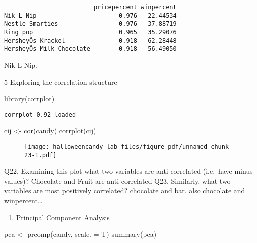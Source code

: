 \documentclass[
  letterpaper,
  DIV=11,
  numbers=noendperiod]{scrartcl}
\newenvironment{Shaded}{\begin{snugshade}}{\end{snugshade}}
\newcommand{\AttributeTok}[1]{\textcolor[rgb]{0.40,0.45,0.13}{#1}}
\newcommand{\FunctionTok}[1]{\textcolor[rgb]{0.28,0.35,0.67}{#1}}
\newcommand{\NormalTok}[1]{\textcolor[rgb]{0.00,0.23,0.31}{#1}}
\newcommand{\OtherTok}[1]{\textcolor[rgb]{0.00,0.23,0.31}{#1}}
\providecommand{\tightlist}{%
  \setlength{\itemsep}{0pt}\setlength{\parskip}{0pt}}\usepackage{longtable,booktabs,array}
\begin{document}
\begin{verbatim}
                         pricepercent winpercent
Nik L Nip                       0.976   22.44534
Nestle Smarties                 0.976   37.88719
Ring pop                        0.965   35.29076
HersheyÕs Krackel               0.918   62.28448
HersheyÕs Milk Chocolate        0.918   56.49050
\end{verbatim}

Nik L Nip.

5 Exploring the correlation structure

\begin{Shaded}
\begin{Highlighting}[]
\FunctionTok{library}\NormalTok{(corrplot)}
\end{Highlighting}
\end{Shaded}

\begin{verbatim}
corrplot 0.92 loaded
\end{verbatim}

\begin{Shaded}
\begin{Highlighting}[]
\NormalTok{cij }\OtherTok{\textless{}{-}} \FunctionTok{cor}\NormalTok{(candy)}
\FunctionTok{corrplot}\NormalTok{(cij)}
\end{Highlighting}
\end{Shaded}

\begin{figure}[H]

{\centering \texttt{[image: halloweencandy\_lab\_files/figure-pdf/unnamed-chunk-23-1.pdf]}

}

\end{figure}

Q22. Examining this plot what two variables are anti-correlated
(i.e.~have minus values)? Chocolate and Fruit are anti-correlated Q23.
Similarly, what two variables are most positively correlated? chocolate
and bar. also chocolate and winpercent\ldots{}

\begin{enumerate}
\def\labelenumi{\arabic{enumi}.}
\setcounter{enumi}{5}
\tightlist
\item
  Principal Component Analysis
\end{enumerate}

\begin{Shaded}
\begin{Highlighting}[]
\NormalTok{pca }\OtherTok{\textless{}{-}} \FunctionTok{prcomp}\NormalTok{(candy, }\AttributeTok{scale. =}\NormalTok{ T)}
\FunctionTok{summary}\NormalTok{(pca)}
\end{Highlighting}
\end{Shaded}
\end{document}
